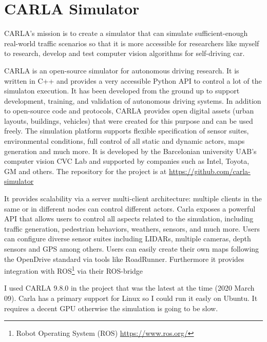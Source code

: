 \chapter{CARLA Simulator}
\label{chap:carlasim}

CARLA's mission is to create a simulator that can simulate sufficient-enough
real-world traffic scenarios so that it is more accessible for researchers like
myself to research, develop and test computer vision algorithms for
self-driving car. 

CARLA\cite{Dosovitskiy17} is an open-source simulator for autonomous driving
research. It is written in C++ and provides a very accessible Python API to
control a lot of the simulaton execution. It has been developed from the ground
up to support development, training, and validation of autonomous driving
systems. In addition to open-source code and protocols, CARLA provides open
digital assets (urban layouts, buildings, vehicles) that were created for this
purpose and can be used freely. The simulation platform supports flexible
specification of sensor suites, environmental conditions, full control of all
static and dynamic actors, maps generation and much more. It is developed by the
Barcelonian university UAB's computer vision CVC Lab and supported by companies
such as Intel, Toyota, GM and others. The repository for the project is at
\url{https://github.com/carla-simulator}

It provides scalability via a server multi-client architecture: multiple clients
in the same or in different nodes can control different actors. Carla exposes a
powerful API that allows users to control all aspects related to the simulation,
including traffic generation, pedestrian behaviors, weathers, sensors, and much
more. Users can configure diverse sensor suites including LIDARs, multiple
cameras, depth sensors and GPS among others. Users can easily create their own
maps following the OpenDrive standard via tools like RoadRunner. Furthermore it
provides integration with ROS\footnote{Robot Operating System (ROS)
\url{https://www.ros.org/}} via their ROS-bridge

I used CARLA 9.8.0 in the project that was the latest at the time (2020 March
09). Carla has a primary support for Linux so I could run it easly on Ubuntu. It
requires a decent GPU otherwise the simulation is going to be slow.

